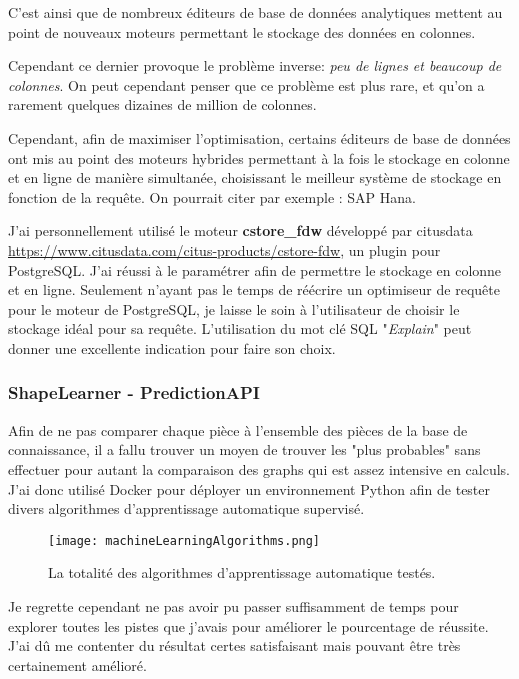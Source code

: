 C'est ainsi que de nombreux éditeurs de base de données analytiques mettent au point de nouveaux moteurs permettant le stockage des données en colonnes.

Cependant ce dernier provoque le problème inverse: \textit{peu de lignes et beaucoup de colonnes}. On peut cependant penser que ce problème est plus rare, et qu'on a rarement quelques dizaines de million de colonnes.

Cependant, afin de maximiser l'optimisation, certains éditeurs de base de données ont mis au point des moteurs hybrides permettant à la fois le stockage en colonne et en ligne de manière simultanée, choisissant le meilleur système de stockage en fonction de la requête. On pourrait citer par exemple : SAP Hana.

J'ai personnellement utilisé le moteur \textbf{cstore\_fdw} développé par citusdata \url{https://www.citusdata.com/citus-products/cstore-fdw}, un plugin pour PostgreSQL. J'ai réussi à le paramétrer afin de permettre le stockage en colonne et en ligne. Seulement n'ayant pas le temps de réécrire un optimiseur de requête pour le moteur de PostgreSQL, je laisse le soin à l'utilisateur de choisir le stockage idéal pour sa requête. L'utilisation du mot clé SQL "\textit{Explain}" peut donner une excellente indication pour faire son choix.


\subsubsection{ShapeLearner - PredictionAPI}
\label{subsec:PredictionAPI}

Afin de ne pas comparer chaque pièce à l'ensemble des pièces de la base de connaissance, il a fallu trouver un moyen de trouver les "plus probables" sans effectuer pour autant la comparaison des graphs qui est assez intensive en calculs.\\

J'ai donc utilisé Docker pour déployer un environnement Python afin de tester divers algorithmes d'apprentissage automatique supervisé.

 \begin{figure}[H]
    \centering
    \texttt{[image: machineLearningAlgorithms.png]}
	\caption{La totalité des algorithmes d'apprentissage automatique testés.}\label{image.MLListe} 
\end{figure}

Je regrette cependant ne pas avoir pu passer suffisamment de temps pour explorer toutes les pistes que j'avais pour améliorer le pourcentage de réussite. J'ai dû me contenter du résultat certes satisfaisant mais pouvant être très certainement amélioré.

